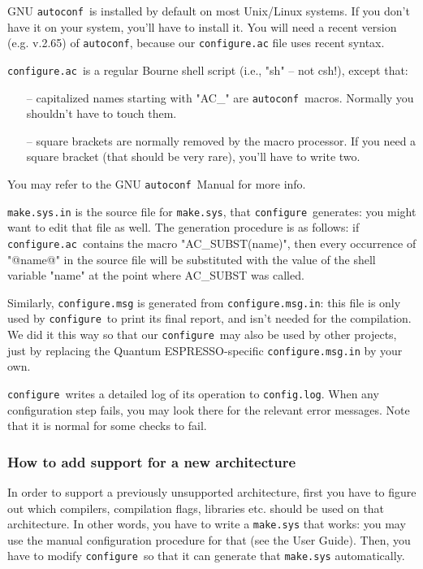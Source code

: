 \documentclass[12pt,a4paper]{article}
\def\qe{{\sc Quantum ESPRESSO}}
\def\configure{\texttt{configure}}
\def\configurac{\texttt{configure.ac}}
\def\autoconf{\texttt{autoconf}}
\begin{document}
GNU \autoconf\ is installed by default on most Unix/Linux systems.  If
you don't have it on your system, you'll have to install it. You will
need a recent version (e.g. v.2.65) of \autoconf, because our \configurac
file uses recent syntax.

\configurac\ is a regular Bourne shell script (i.e., "sh" -- not csh!), 
except that:
\begin{itemize}
\item[--] capitalized names starting with "AC\_" are \autoconf\
  macros.  Normally you shouldn't have to touch them. 
\item[--] square brackets are normally removed by the macro processor.
  If you need a square bracket (that should be very rare), you'll have
  to write two. 
\end{itemize}

You may refer to the GNU \autoconf\ Manual for more info.

\texttt{make.sys.in} is the source file for \texttt{make.sys}, that
\configure\ generates: you might want to edit that file as well. 
The generation procedure is as follows: if \configurac\ contains the macro
"AC\_SUBST(name)", then every occurrence of "@name@" in the source
file will be substituted with the value of the shell variable "name"
at the point where AC\_SUBST was called.

Similarly, \configure\texttt{.msg} is generated from \configure\texttt{.msg.in}: this
file is only used by \configure\ to print its final report, and isn't
needed for the compilation.  We did it this way so that our
\configure\ may also be used by other projects, just by replacing the
\qe-specific \configure\texttt{.msg.in} by your own.

\configure\ writes a detailed log of its operation to \texttt{config.log}.
When any configuration step fails, you may look there for the relevant
error messages.  Note that it is normal for some checks to fail.

\subsubsection{How to add support for a new architecture}

In order to support a previously unsupported architecture, first you
have to figure out which compilers, compilation flags, libraries
etc. should be used on that architecture.
In other words, you have to write a \texttt{make.sys} that works: you may use
the manual configuration procedure for that (see the 
User Guide).  Then, you have to modify \configure\ so that it can
generate that \texttt{make.sys} automatically.
\end{document}

